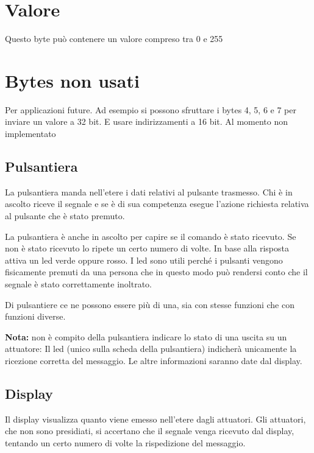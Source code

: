 \documentclass[italian]{article}
\begin{document}
    \section*{Valore}
    
    Questo byte può contenere un valore compreso tra 0 e 255
    
    \section*{Bytes non usati}
    
    Per applicazioni future. Ad esempio si possono sfruttare i bytes 4, 5, 6 e 7 per inviare un valore a 32 bit. E usare indirizzamenti a 16 bit. Al momento non implementato
    

	\subsection*{Pulsantiera}
	
	La pulsantiera manda nell'etere i dati relativi al pulsante trasmesso. Chi è in ascolto riceve il segnale e se è di sua competenza esegue l'azione richiesta relativa al pulsante che è stato premuto.
	
	La pulsantiera è anche in ascolto per capire se il comando è stato ricevuto. Se non è stato ricevuto lo ripete un certo numero di volte. In base alla risposta attiva un led verde oppure rosso. I led sono utili perché i pulsanti vengono fisicamente premuti da una persona che in questo modo può rendersi conto che il segnale è stato correttamente inoltrato.
	
	Di pulsantiere ce ne possono essere più di una, sia con stesse funzioni che con funzioni diverse.
	
	\bigskip
	
	\textbf{Nota:} non è compito della pulsantiera indicare lo stato di una uscita su un attuatore: Il led (unico sulla scheda della pulsantiera) indicherà unicamente la ricezione corretta del messaggio. Le altre informazioni saranno date dal display.
	
	\subsection*{Display}
	
	Il display visualizza quanto viene emesso nell'etere dagli attuatori. {\scriptsize Gli attuatori, che non sono presidiati, si accertano che il segnale venga ricevuto dal display, tentando un certo numero di volte la rispedizione del messaggio.}
	
\end{document}
